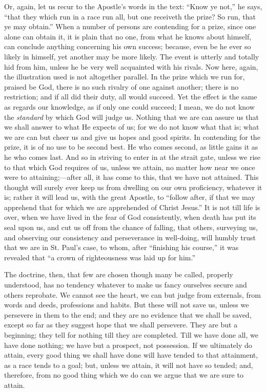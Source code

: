 Or, again, let us recur to the Apostle's words in the text:
``Know ye not,'' he says, ``that they which run in a race
run all, but one receiveth the prize? So run, that ye may
obtain.'' When a number of persons are contending for a prize,
since one alone can obtain it, it is plain that no one, from what he
knows about himself, can conclude anything concerning his own success;
because, even be he ever so likely in himself, yet another may be more
likely. The event is utterly and totally hid from him, unless he be
very well acquainted with his rivals. Now here, again, the
illustration used is not altogether parallel. In the prize which we
run for, praised be God, there is no such rivalry of one against
another; there is no restriction; and if all did their duty, all would
succeed. Yet the effect is the same as regards our knowledge, as if
only one could succeed; I mean, we do not know the \emph{standard} by
which God will judge us. Nothing that we are can assure us that we
shall answer to what He expects of us; for we do not know what that
is; what we are can but cheer us and give us hopes and good spirits.
In contending for the prize, it is of no use to be second best. He who
comes second, as little gains it as he who comes last. And so in
striving to enter in at the strait gate, unless we rise to that which
God requires of us, unless we attain, no matter how near we once were
to attaining;—after all, it has come to this, that we have not
attained. This thought will surely ever keep us from dwelling on our
own proficiency, whatever it is; rather it will lead us, with the
great Apostle, to ``follow after, if that we may apprehend that
for which we are apprehended of Christ Jesus.'' It is not till
life is over, when we have lived in the fear of God consistently, when
death has put its seal upon us, and cut us off from the chance of
falling, that others, surveying us, and observing our consistency and
perseverance in well-doing, will humbly trust that we are in St.
Paul's case, to whom, after ``finishing his course,'' it was
revealed that ``a crown of righteousness was laid up for
him.''

The doctrine, then, that few are chosen though many be called,
properly understood, has no tendency whatever to make us fancy
ourselves secure and others reprobate. We cannot see the heart, we can
but judge from externals, from words and deeds, professions and
habits. But these will not save us, unless we persevere in them to the
end; and they are no evidence that we shall be saved, except so far as
they suggest hope that we shall persevere. They are but a beginning;
they tell for nothing till they are completed. Till we have done all,
we have done nothing; we have but a prospect, not possession. If we
ultimately do attain, every good thing we shall have done will have
tended to that attainment, as a race tends to a goal; but, unless we
attain, it will not have so tended; and, therefore, from no good thing
which we do can we argue that we are sure to attain.

